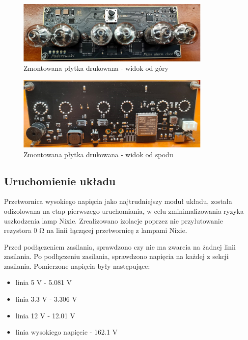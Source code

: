 \documentclass[../main.tex]{subfiles}
\begin{document}
\begin{figure}[H]
    \centering
    \includegraphics[width=0.85\textwidth]{gora.jpeg}
    \caption{Zmontowana płytka drukowana - widok od góry}
    \label{fig:gora}
\end{figure}

\begin{figure}[H]
    \centering
    \includegraphics[width=0.85\textwidth]{dol.jpeg}
    \caption{Zmontowana płytka drukowana - widok od spodu}
    \label{fig:dol}
\end{figure}


\subsection{Uruchomienie układu}
Przetwornica wysokiego napięcia jako najtrudniejszy moduł układu, została odizolowana na etap pierwszego uruchomiania, w celu zminimalizowania ryzyka uszkodzenia lamp Nixie. Zrealizowano izolacje
poprzez nie przylutowanie rezystora 0 \si{\ohm} na linii łączącej przetwornicę z lampami Nixie. 

Przed podłączeniem zasilania, sprawdzono czy nie ma zwarcia na żadnej linii zasilania.
Po podłączeniu zasilania, sprawdzono napięcia na każdej z sekcji zasilania. Pomierzone napięcia były następujące:
\begin{itemize}
    \item linia 5 V - 5.081 V
    \item linia 3.3 V - 3.306 V
    \item linia 12 V - 12.01 V
    \item linia wysokiego napięcie - 162.1 V
\end{itemize}
\end{document}

